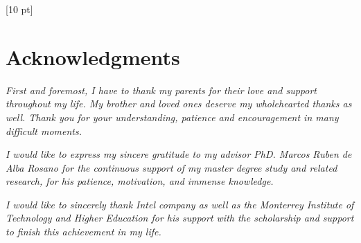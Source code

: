 \titleformat{\chapter}{\Huge\bfseries}{\thechapter}{0 pt}{\rule{340 pt}{3 pt}\\}
\titlespacing{\chapter}{100 pt}{-25 pt}{40 pt}[10 pt]	
\pagestyle{fancy}
\fancyhead[RO,RE]{\thepage}
\fancyfoot[CO,CE]{}

\chapter*{Acknowledgments}

\vspace{140 pt}

\normalsize
\begin{flushright}
\textit{First and foremost, I have to thank my parents for their love and support
throughout my life. My brother and loved ones deserve my wholehearted thanks as
well. Thank you for your understanding, patience and encouragement in many
difficult moments.}

\textit{I would like to express my sincere gratitude to my advisor PhD.
Marcos Ruben de Alba Rosano for the continuous support of my master degree 
study and related research, for  his patience, motivation,
and immense knowledge.}

\textit{I would like to sincerely thank Intel company as well as the Monterrey
Institute of Technology and Higher Education for his support with the
scholarship and support to finish this achievement in my life.}

\end{flushright}
\clearpage
